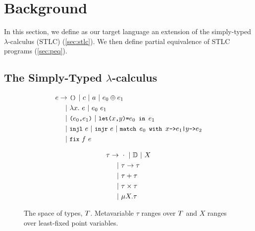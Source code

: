 \section{Background}
\label{sec:background}
%
In this section, we define as our target language an extension of the
simply-typed $\lambda$-calculus (STLC) (\autoref{sec:stlc}).
%
We then define partial equivalence of STLC programs
(\autoref{sec:peq}).

\subsection{The Simply-Typed $\lambda$-calculus}
\label{sec:stlc}
\begin{figure}[t]
  \begin{minipage}{0.55\linewidth}
    \begin{align*}
      e \rightarrow &\ \unit\ 
                      |\ c\
                      |\ a\ 
                      |\ e_0 \oplus e_1 \\
      | &\ \lambda x.\ e \
          | \ e_0\ e_1 \\
      | &\ \pair{e_0}{e_1} \
          |\ \letexp{x}{y}{e_0}{e_1} \\
      | &\ \injl\ e\ |\ \injr\ e\ |\ \matchexp{e_0}{x}{e_1}{y}{e_2} \\
      | &\ \fix{f}{e}
    \end{align*}
    \caption{The space of program expressions, $\expr$.
      Metavariable $e$ ranges over $\expr$, %
      $c$ ranges over $\const$, %
      $a$ ranges over $\vars$, %
      $x$ and $y$ range over abstraction variables, and %
      $f$ ranges over $\fixvars$. } %
    \label{fig:exprs}
  \end{minipage}
  \qquad
  \begin{minipage}{0.36\linewidth}
    \begin{align*} %
      \tau \rightarrow &\ \unitty\ |\ \basety\ |\ X \\
      | &\ \tau \rightarrow \tau \\
      | &\ \tau + \tau \\
      | &\ \tau \times \tau \\
      | &\ \mu X. \tau
    \end{align*}
    \caption{The space of types, $T$.
      Metavariable $\tau$ ranges over $T$ and $X$ ranges over
      least-fixed point variables.} %
    \label{fig:types}
  \end{minipage}
\end{figure}

